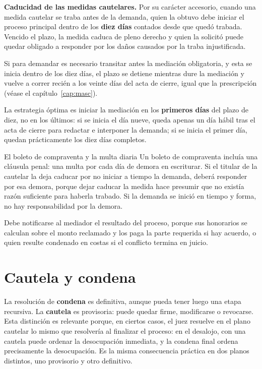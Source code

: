 \documentclass[12pt,oneside]{book}
\begin{document}
\begin{normacitada}
\textbf{Caducidad de las medidas cautelares.} Por su carácter accesorio, cuando una medida cautelar se traba antes de la demanda, quien la obtuvo debe iniciar el proceso principal dentro de los \textbf{diez días} contados desde que quedó trabada. Vencido el plazo, la medida caduca de pleno derecho y quien la solicitó puede quedar obligado a responder por los daños causados por la traba injustificada.
\end{normacitada}

Si para demandar es necesario transitar antes la mediación obligatoria, y esta se inicia dentro de los diez días, el plazo se detiene mientras dure la mediación y vuelve a correr recién a los veinte días del acta de cierre, igual que la prescripción (véase el capítulo~\ref{cap:masc}).

\begin{important}
La estrategia óptima es iniciar la mediación en los \textbf{primeros días} del plazo de diez, no en los últimos: si se inicia el día nueve, queda apenas un día hábil tras el acta de cierre para redactar e interponer la demanda; si se inicia el primer día, quedan prácticamente los diez días completos.
\end{important}

\begin{example}{El boleto de compraventa y la multa diaria}
Un boleto de compraventa incluía una cláusula penal: una multa por cada día de demora en escriturar. Si el titular de la cautelar la deja caducar por no iniciar a tiempo la demanda, deberá responder por esa demora, porque dejar caducar la medida hace presumir que no existía razón suficiente para haberla trabado. Si la demanda se inició en tiempo y forma, no hay responsabilidad por la demora.
\end{example}

\begin{note}
Debe notificarse al mediador el resultado del proceso, porque sus honorarios se calculan sobre el monto reclamado y los paga la parte requerida si hay acuerdo, o quien resulte condenado en costas si el conflicto termina en juicio.
\end{note}

\section{Cautela y condena}

La resolución de \textbf{condena} es definitiva, aunque pueda tener luego una etapa recursiva. La \textbf{cautela} es provisoria: puede quedar firme, modificarse o revocarse. Esta distinción es relevante porque, en ciertos casos, el juez resuelve en el plano cautelar lo mismo que resolvería al finalizar el proceso: en el desalojo, con una cautela puede ordenar la desocupación inmediata, y la condena final ordena precisamente la desocupación. Es la misma consecuencia práctica en dos planos distintos, uno provisorio y otro definitivo.
\end{document}
